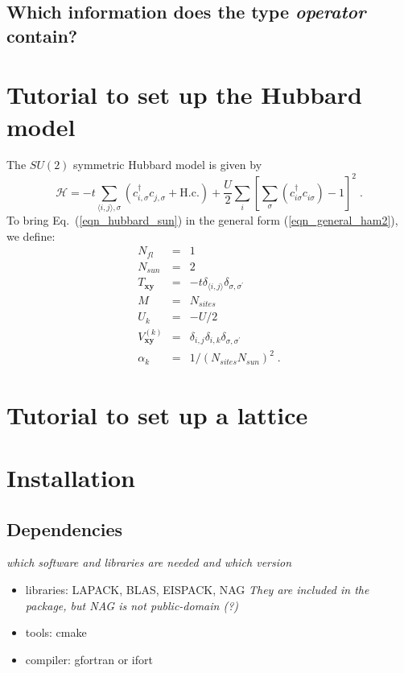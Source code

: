 \documentclass[10pt,Arial]{article}
\begin{document}
\subsection{Which information does the type \textit{operator} contain?}

\section{Tutorial to set up the Hubbard model}
The $SU(2)$ symmetric Hubbard model is given by
\begin{equation}
\label{eqn_hubbard_sun}
\mathcal{H}=
-t\sum\limits_{\langle i,j\rangle,\sigma} 
\left(c^{\dagger}_{i,\sigma} c^{\phantom\dagger}_{j,\sigma} + \text{H.c.}
\right)
+ \frac{U}{2}\sum\limits_{i}\left[
\sum\limits_{\sigma}
( c^{\dagger}_{i\sigma} c^{\phantom\dagger}_{i\sigma}) -1 \right]^{2}\;.
\end{equation}
To bring Eq.~(\ref{eqn_hubbard_sun}) in the general form (\ref{eqn_general_ham2}), we define:
\begin{eqnarray}
N_{fl}&=&1\nonumber\\
N_{sun}&=&2\nonumber\\
T_{\bm{x}\bm{y}}&=&-t\delta_{\langle i,j\rangle}\delta_{\sigma,\sigma^{\prime}}\nonumber\\
M&=&N_{sites}\nonumber\\
U_{k}&=&-U/2\nonumber\\
V_{\bm{x}\bm{y}}^{(k)}&=&\delta_{i,j}\delta_{i,k}\delta_{\sigma,\sigma^{\prime}}\nonumber\\
\alpha_{k}&=&1/(N_{sites}N_{sun})^{2}\;.
\end{eqnarray}

\section{Tutorial to set up a lattice}

\section{Installation}
\subsection{Dependencies}
\textit{which software and libraries are needed and which version}
\begin{itemize}
\item libraries: LAPACK, BLAS, EISPACK, NAG \textit{They are included in the package, but NAG is not  public-domain (?)}
\item tools: cmake
\item compiler: gfortran or ifort
\end{itemize}
\end{document}
